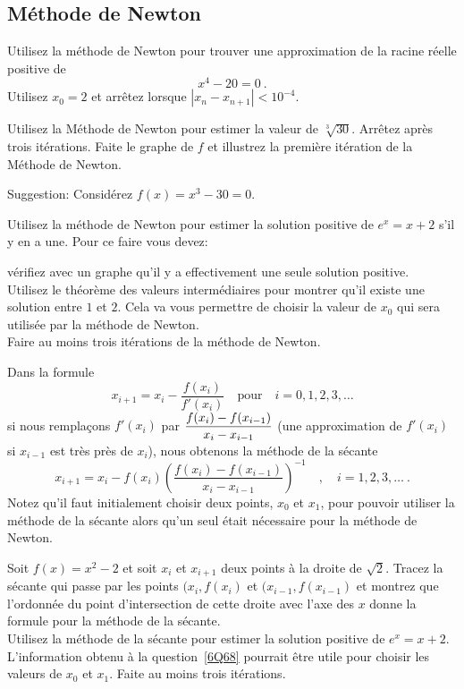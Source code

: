 \subsection{Méthode de Newton}

\begin{question}[\life \eng]
Utilisez la méthode de Newton pour trouver une approximation de la
racine réelle positive de 
\[
x^4-20 = 0 \ .
\]
Utilisez $x_0=2$ et arrêtez lorsque $|x_n - x_{n+1}| < 10^{-4}$.
\label{6Q66}
\end{question}

\begin{question}[\life \eng]
Utilisez la Méthode de Newton pour estimer la valeur de
$\sqrt[3]{30}$.  Arrêtez après trois itérations.  Faite le graphe de
$f$ et illustrez la première itération de la Méthode de Newton.

\noindent Suggestion: Considérez $f(x) = x^3-30=0$.
\label{6Q67}
\end{question}

\begin{question}[\life \eng]
Utilisez la méthode de Newton pour estimer la solution positive de
$e^x = x + 2$ s'il y en a une.  Pour ce faire vous devez:

 vérifiez avec un graphe qu'il y a effectivement une seule
solution positive.\\
 Utilisez le théorème des valeurs intermédiaires pour montrer
qu'il existe une solution entre $1$ et $2$.  Cela va vous permettre de
choisir la valeur de $x_0$ qui sera utilisée par la méthode de Newton.\\
 Faire au moins trois itérations de la méthode de Newton.
\label{6Q68}
\end{question}

\begin{question}
Dans la formule
\[
x_{i+1} = x_i  - \frac{f(x_i)}{f'(x_i)} \quad \text{pour}
\quad i=0, 1, 2, 3, \ldots
\]
si nous remplaçons $f'(x_i)$ par
$\displaystyle \frac{f(x_i)-f(x_{i-1})}{x_i - x_{i-1}}$ (une
approximation de $f'(x_i)$ si $x_{i-1}$ est très près de $x_i$), nous
obtenons la méthode de la sécante
\[
x_{i+1} = x_i  - f(x_i)\left(\frac{f(x_i)-f(x_{i-1})}{x_i - x_{i-1}}\right)^{-1}
\quad , \quad i=1, 2, 3, \ldots \ .
\]
Notez qu'il faut initialement choisir deux points, $x_0$ et $x_1$,
pour pouvoir utiliser la méthode de la sécante alors qu'un seul était
nécessaire pour la méthode de Newton.

  Soit $f(x) = x^2 -2$ et soit $x_i$ et $x_{i+1}$ deux points
à la droite de $\sqrt{2}$.  Tracez la sécante qui passe par les points
$(x_i, f(x_i)$ et $(x_{i-1}, f(x_{i-1})$ et montrez que l'ordonnée du
point d'intersection de cette droite avec l'axe des $x$ donne la
formule pour la méthode de la sécante.\\
 Utilisez la méthode de la sécante pour estimer la solution
positive de $e^x = x + 2$.  L'information obtenu à la
question~\ref{6Q68} pourrait être utile pour choisir les valeurs de
$x_0$ et $x_1$.  Faite au moins trois itérations.
\label{6Q69}
\end{question}

